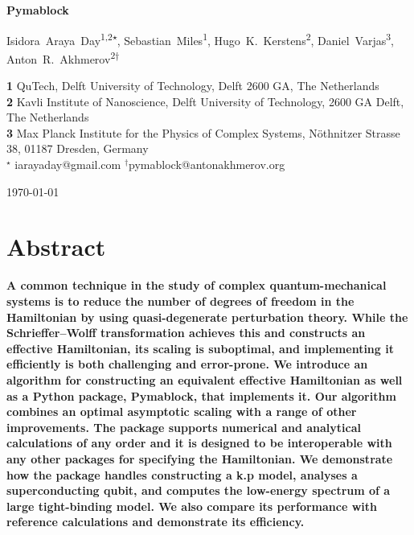 \documentclass[submission, Codebases]{SciPost}
\begin{document}
\begin{center}
{\Large \textbf{Pymablock}}
\end{center}

\begin{center}
Isidora~Araya~Day\textsuperscript{1,2$\star$},
Sebastian~Miles\textsuperscript{1},
Hugo~K.~Kerstens\textsuperscript{2},
Daniel~Varjas\textsuperscript{3},
Anton~R.~Akhmerov\textsuperscript{2$\dagger$}
\end{center}

\begin{center}
\textbf{1} QuTech, Delft University of Technology, Delft 2600 GA, The Netherlands \\
\textbf{2} Kavli Institute of Nanoscience, Delft University of Technology, 2600 GA Delft, The Netherlands \\
\textbf{3} Max Planck Institute for the Physics of Complex Systems, Nöthnitzer Strasse 38, 01187 Dresden, Germany \\
${}^\star$ {\small \sf iarayaday@gmail.com}
${}^\dagger${\small \sf pymablock@antonakhmerov.org}
\end{center}

\begin{center}
    \today
\end{center}

\section*{Abstract}
\textbf{
A common technique in the study of complex quantum-mechanical systems is to reduce the number of degrees of freedom in the Hamiltonian by using quasi-degenerate perturbation theory.
While the Schrieffer--Wolff transformation achieves this and constructs an effective Hamiltonian, its scaling is suboptimal, and implementing it efficiently is both challenging and error-prone.
We introduce an algorithm for constructing an equivalent effective Hamiltonian as well as a Python package, Pymablock, that implements it.
Our algorithm combines an optimal asymptotic scaling with a range of other improvements.
The package supports numerical and analytical calculations of any order and it is designed to be interoperable with any other packages for specifying the Hamiltonian.
We demonstrate how the package handles constructing a k.p model, analyses a superconducting qubit, and computes the low-energy spectrum of a large tight-binding model.
We also compare its performance with reference calculations and demonstrate its efficiency.
}
\end{document}
